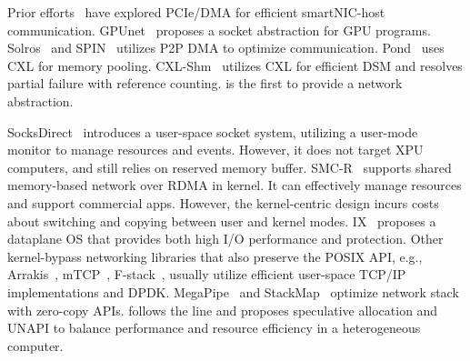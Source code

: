 Prior efforts~\cite{10.1145/2934872.2934897, 10.1145/2872362.2872401, 10.1145/3230543.3230560, 234944} have explored PCIe/DMA for efficient smartNIC-host communication.
GPUnet~\cite{kim2014gpunet} proposes a socket abstraction for GPU programs.
Solros~\cite{min2018s} and SPIN~\cite{bergman2017spin} utilizes P2P DMA to optimize communication.
Pond~\cite{10.1145/3575693.3578835} uses CXL for memory pooling.
CXL-Shm~\cite{10.1145/3600006.3613135} utilizes CXL for efficient DSM and resolves partial failure with reference counting.
\os is the first to provide a network abstraction.

SocksDirect~\cite{10.1145/3341302.3342071} introduces a user-space socket system,
utilizing a user-mode monitor to manage resources and events.
However, it does not target XPU computers, and still relies on reserved memory buffer.
SMC-R~\cite{rfc7609} supports shared memory-based network over RDMA in kernel.
It can effectively manage resources and support commercial apps.
However, the kernel-centric design incurs costs about switching and copying between user and kernel modes.
IX~\cite{belay2014ix} proposes a dataplane OS that provides both high I/O performance and protection.
Other kernel-bypass networking libraries that also preserve the POSIX API, e.g., Arrakis~\cite{peter2015arrakis}, mTCP~\cite{10.5555/2616448.2616493}, F-stack~\cite{f-stack},
usually utilize efficient user-space TCP/IP implementations and DPDK.
MegaPipe~\cite{10.5555/2387880.2387894} and StackMap~\cite{196184} optimize network stack with zero-copy APIs.
\os follows the line and proposes speculative allocation and UNAPI to balance performance and resource efficiency in a heterogeneous computer.


